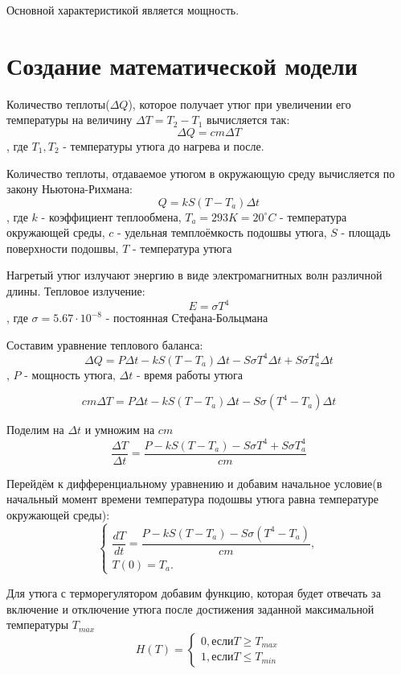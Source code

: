 \documentclass[a4paper, 14pt]{extarticle}
\begin{document}
		Основной характеристикой является мощность.

	\section{Создание математической модели}
		Количество теплоты(\(\Delta Q\)), которое получает утюг при увеличении его температуры на величину 
		\( \Delta T = T_2 - T_1 \) вычисляется так:
		\[ \Delta Q = cm \Delta T \], где \( T_1, T_2\) - температуры утюга до нагрева и после.
		
		Количество теплоты, отдаваемое утюгом в окружающую среду вычисляется по закону Ньютона-Рихмана:
		\[ Q = kS(T-T_a) \Delta t \]
		, где \(k\) - коэффициент теплообмена, $T_a = 293K = 20^{\circ}C$ - температура окружающей среды,
		$c$ - удельная темплоёмкость подошвы утюга, $S$ - площадь поверхности подошвы, $T$ - температура утюга
			
		Нагретый утюг излучают энергию в виде электромагнитных волн различной длины. Тепловое излучение:
		\[ E = \sigma T^4 \]
		, где \( \sigma = 5.67 \cdot 10^{-8} \) - постоянная Стефана-Больцмана
		
		Составим уравнение теплового баланса:
		\[ \Delta Q = P\Delta t - kS(T-T_a) \Delta t - S \sigma T^4 \Delta t +  S \sigma T_a^4 \Delta t\],
		$P$ - мощность утюга, $\Delta t$ - время работы утюга
		
		\[ cm \Delta T = P\Delta t - kS(T-T_a) \Delta t - S \sigma (T^4 - T_a) \Delta t \]
		
		Поделим на \( \Delta t\) и умножим на \(cm\)
		\[ \dfrac{\Delta T}{\Delta t} 
		= \dfrac{P - kS(T-T_a) - S \sigma T^4 +  S \sigma T_a^4}{cm}\]
		
		Перейдём к дифференциальному уравнению и добавим начальное условие(в начальный момент времени
		температура подошвы утюга равна температуре окружающей среды):
		\[
			\begin{cases}
				\dfrac{dT}{dt} = \dfrac{P - kS(T-T_a) - S \sigma (T^4 - T_a)}{cm},\\
				T(0) = T_a.
			\end{cases} \tag{1} \label{eq:1}
		\]
		
		Для утюга с терморегулятором добавим функцию, которая будет отвечать за включение и отключение утюга
		после достижения заданной максимальной температуры $T_{max}$
		\[ H(T) = 
			\begin{cases}
				0, \text{если} T \geq T_{max}\\
				1, \text{если} T \leq T_{min}
			\end{cases} 
		\]
		
\end{document}
